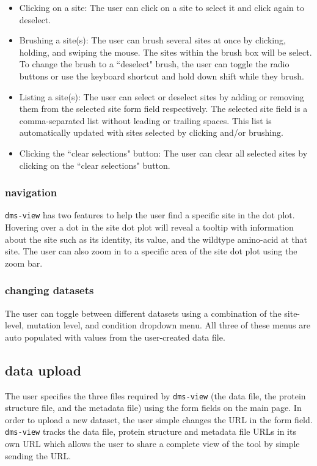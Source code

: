 \begin{itemize}
  \item Clicking on a site: The user can click on a site to select it and click again to deselect.
  \item Brushing a site(s): The user can brush several sites at once by clicking, holding, and swiping the mouse. The sites within the brush box will be select. To change the brush to a ``deselect" brush, the user can toggle the radio buttons or use the keyboard shortcut and hold down shift while they brush.
  \item Listing a site(s): The user can select or deselect sites by adding or removing them from the selected site form field respectively. The selected site field is a comma-separated list without leading or trailing spaces. This list is automatically updated with sites selected by clicking and/or brushing.
  \item Clicking the ``clear selections" button: The user can clear all selected sites by clicking on the ``clear selections" button.
\end{itemize}

\subsubsection{navigation}
\texttt{dms-view} has two features to help the user find a specific site in the dot plot.
Hovering over a dot in the site dot plot will reveal a tooltip with information about the site such as its identity, its value, and the wildtype amino-acid at that site.
The user can also zoom in to a specific area of the site dot plot using the zoom bar.

\subsubsection{changing datasets}

The user can toggle between different datasets using a combination of the site-level, mutation level, and condition dropdown menu.
All three of these menus are auto populated with values from the user-created data file.

\subsection{data upload}

The user specifies the three files required by \texttt{dms-view} (the data file, the protein structure file, and the metadata file) using the form fields on the main page.
In order to upload a new dataset, the user simple changes the URL in the form field.
\texttt{dms-view} tracks the data file, protein structure and metadata file URLs in its own URL which allows the user to share a complete view of the tool by simple sending the URL.

